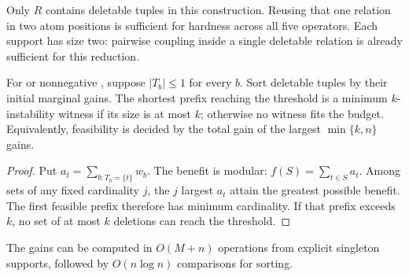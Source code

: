 Only $R$ contains deletable tuples in this construction. Reusing that one
relation in two atom positions is sufficient for hardness across all five
operators. Each support has size two: pairwise coupling inside a single
deletable relation is already sufficient for this reduction.

\begin{proposition}
\label{prop:modular}
For  or nonnegative , suppose $|T_b|\le1$ for
every $b$. Sort deletable tuples by their initial marginal gains. The
shortest prefix reaching the threshold is a minimum $k$-instability
witness if its size is at most $k$; otherwise no witness fits the budget.
Equivalently, feasibility is decided by the total gain of the largest
$\min\{k,n\}$ gains.
\end{proposition}
\begin{proof}
Put $a_t=\sum_{b:T_b=\{t\}}w_b$. The benefit is modular:
$f(S)=\sum_{t\in S}a_t$. Among sets of any fixed cardinality $j$, the
$j$ largest $a_t$ attain the greatest possible benefit. The first feasible
prefix therefore has minimum cardinality. If that prefix exceeds $k$,
no set of at most $k$ deletions can reach the threshold.
\end{proof}
The gains can be computed in $O(M+n)$ operations from explicit singleton
supports, followed by $O(n\log n)$ comparisons for sorting.

